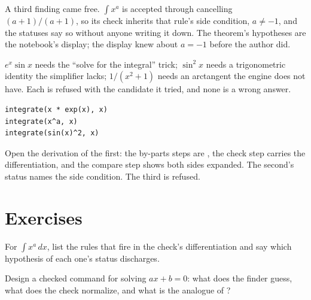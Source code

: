 A third finding came free. $\int x^a$ is accepted through  cancelling
$(a+1)/(a+1)$, so its check inherits that rule's side condition, $a \neq -1$, and the statuses say
so without anyone writing it down. The theorem's hypotheses are the notebook's display; the
display knew about $a = -1$ before the author did.

\begin{logbox}
  $e^x \sin x$ needs the ``solve for the integral'' trick; $\sin^2 x$ needs a trigonometric
  identity the simplifier lacks; $1/(x^2 + 1)$ needs an arctangent the engine does not have. Each
  is refused with the candidate it tried, and none is a wrong answer.
\end{logbox}

\begin{trybox}
\begin{verbatim}
integrate(x * exp(x), x)
integrate(x^a, x)
integrate(sin(x)^2, x)
\end{verbatim}
  Open the derivation of the first: the by-parts steps are , the check step
  carries the differentiation, and the compare step shows both sides expanded. The second's
  status names the side condition. The third is refused.
\end{trybox}

\section{Exercises}

\begin{exercisebox}
  For $\int x^a\,dx$, list the rules that fire in the check's differentiation and say which
  hypothesis of  each one's status discharges.
\end{exercisebox}

\begin{exercisebox}
  Design a checked command for solving $ax + b = 0$: what does the finder guess, what does the
  check normalize, and what is the analogue of ?
\end{exercisebox}
